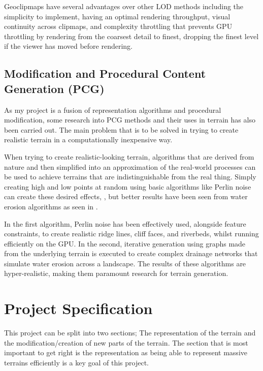 \documentclass[notitlepage,12pt]{article}
\begin{document}
Geoclipmaps have several advantages over other LOD methods including the simplicity to implement, having an optimal rendering throughput, visual continuity across clipmaps, and complexity throttling that prevents GPU throttling by rendering from the coarsest detail to finest, dropping the finest level if the viewer has moved before rendering.

\subsection{Modification and Procedural Content Generation (PCG)} \label{pcg}

As my project is a fusion of representation algorithms and procedural modification, some research into PCG methods and their uses in terrain has also been carried out. The main problem that is to be solved in trying to create realistic terrain in a computationally inexpensive way.

When trying to create realistic-looking terrain, algorithms that are derived from nature and then simplified into an approximation of the real-world processes can be used to achieve terrains that are indistinguishable from the real thing. Simply creating high and low points at random using basic algorithms like Perlin noise can create these desired effects, \cite{perlin}, but better results have been seen from water erosion algorithms as seen in \cite{hydrology}.

In the first algorithm, Perlin noise has been effectively used, alongside feature constraints, to create realistic ridge lines, cliff faces, and riverbeds, whilst running efficiently on the GPU. In the second, iterative generation using graphs made from the underlying terrain is executed to create complex drainage networks that simulate water erosion across a landscape. The results of these algorithms are hyper-realistic, making them paramount research for terrain generation.

\section{Project Specification}

This project can be split into two sections; The representation of the terrain and the modification/creation of new parts of the terrain. The section that is most important to get right is the representation as being able to represent massive terrains efficiently is a key goal of this project.
\end{document}
